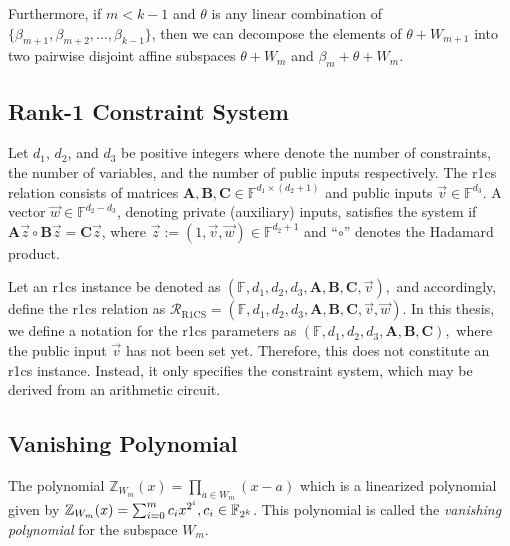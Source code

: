 Furthermore, if $m < k-1$ and $\theta$ is any linear combination of $\{\beta_{m+1}, \beta_{m+2}, \ldots, \beta_{k-1}\}$, then we can decompose the elements of $\theta + W_{m+1}$ into two pairwise disjoint affine subspaces $\theta + W_m$ and $\beta_{m} + \theta + W_m$.

\subsection{Rank-1 Constraint System}

\begin{definition} \label{def:R1CS}
	Let $d_1$, $d_2$, and $d_3$ be positive integers where denote the number of constraints, the number of variables, and the number of public inputs respectively. The \gls{r1cs} relation consists of matrices $\mathbf{A},\mathbf{B},\mathbf{C} \in \mathbb{F}^{d_1\times (d_2+1)}$ and public inputs $\vec{{v}} \in \mathbb{F}^{d_3}$. A vector $\vec{{w}} \in \mathbb{F}^{d_2-d_3}$, denoting private (auxiliary) inputs, satisfies the system if
	\(
	\mathbf{A}\vec{{z}} \circ \mathbf{B}\vec{{z}} = \mathbf{C}\vec{{z}}
	\), 
	where $\vec{z}:=(1,\vec{v},\vec{w}) \in \mathbb{F}^{d_2+1}$ and “$\circ$” denotes the Hadamard product.
\end{definition}
Let an \gls{r1cs} instance be denoted as 
\(
(\mathbb{F}, d_1, d_2, d_3, \mathbf{A}, \mathbf{B}, \mathbf{C}, \vec{v}),
\)
and accordingly, define the \gls{r1cs} relation as
\(
\mathcal{R}_{\text{R1CS}} = (\mathbb{F}, d_1, d_2, d_3, \mathbf{A}, \mathbf{B}, \mathbf{C}, \vec{v}, \vec{w}).
\)
In this thesis, we define a notation for the \gls{r1cs} parameters as 
\(
(\mathbb{F}, d_1, d_2, d_3, \mathbf{A}, \mathbf{B}, \mathbf{C}),
\)
where the public input \(\vec{v}\) has not been set yet. Therefore, this does not constitute an \gls{r1cs} instance. Instead, it only specifies the constraint system, which may be derived from an arithmetic circuit.



\subsection{Vanishing Polynomial}
\begin{definition}
	The polynomial $\mathbb{Z}_{W_{m}}(x)= \prod_{a\in W_m}^{} (x-a)$ which is a linearized polynomial given by $\mathbb{Z}_{W_{m}}(x) = \sum_{i=0}^{m} c_i x^{2^i}, c_i \in {\mathbb F}_{2^k}$. This polynomial is called the \textit{vanishing polynomial} for the subspace $W_m$.
\end{definition}

